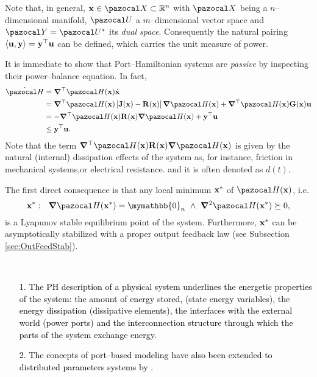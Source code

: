 %
Note that, in general, $\xb\in\X\subset\R^n$ with $\X$ being a $n$--dimensional manifold, $\U$ a $m$--dimensional vector space and $\Y = \U^*$ its \textit{dual space}. Consequently the natural pairing $\langle\mathbf{u},\mathbf{y}\rangle = \mathbf{y}^\top\mathbf{u}$ can be defined, which carries the unit measure of power.
%
\newline

%
It is immediate to show that Port--Hamiltonian systems are \textit{passive} by inspecting their power--balance equation. In fact,
%
\begin{align}
    \dot{\Ha} &= \bm{\nabla}^\top\Ha(\x)\dot{\x} \\
              &= \bm{\nabla}^\top\Ha(\x)\left[\mathbf{J}(\xb) - \mathbf{R}(\xb)\right]\bm{\nabla}\Ha(\xb) + \bm{\nabla}^\top\Ha(\x)\mathbf{G}(\xb)\mathbf{u} \\
              &= -\bm{\nabla}^\top\Ha(\x)\mathbf{R}(\xb)\bm{\nabla}\Ha(\xb) + \yb^\top\ub \\
              &\leq \yb^\top\ub.
\end{align}
%
Note that the term $\bm{\nabla}^\top\Ha(\x)\mathbf{R}(\xb)\bm{\nabla}\Ha(\xb)$ is given by the natural (internal) dissipation effects of the system as, for instance, friction in mechanical systems,or electrical resistance. and it is often denoted as $d(t)$.
%

%
The first direct consequence is that any local minimum $\mathbf{x}^*$ of $\Ha(\xb)$, i.e.
\begin{equation}
    \xb^*:~~\bm\nabla\Ha(\x^*) = \mymathbb{0}_n~\land~\bm\nabla^2\Ha(\x^*)\succeq 0,
\end{equation}
is a Lyapunov stable equilibrium point of the system. Furthermore, $\mathbf{x}^*$ can be asymptotically stabilized with a proper output feedback law (see Subsection \ref{sec:OutFeedStab}).
%
\textcolor{black}{
\begin{rem}\textcolor{white}{a}
    \begin{itemize}
	\item [1.] The PH description of a physical system underlines the energetic properties of the system: the amount of energy stored, (state energy variables), the energy dissipation (dissipative elements), the interfaces with the external world (power ports) and the interconnection structure through which the parts of the system exchange energy.
	\item [2.] The concepts of port--based modeling have also been extended to distributed parameters systems by \cite{MASCHKE200027,maschke2001hamiltonian} \cite{rodriguez2001stabilization,macchelli2003port,macchelli2004modeling,macchelli2004port2,macchelli2004port}.
    \end{itemize}
\end{rem}}

